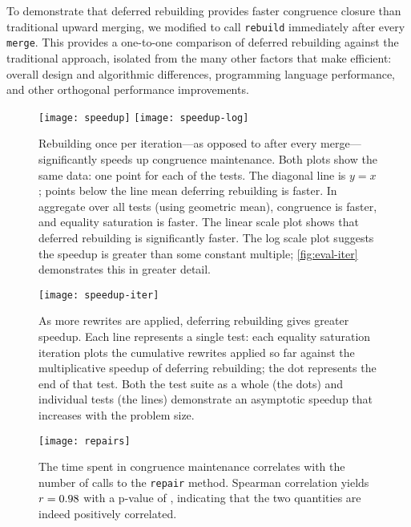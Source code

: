 To demonstrate that deferred rebuilding
  provides faster congruence closure than traditional upward merging,
  we modified \egg to call \texttt{rebuild} immediately after every \texttt{merge}.
This provides a one-to-one comparison of deferred rebuilding against the
  traditional approach, isolated
  from the many other factors that make \egg efficient: overall design
  and algorithmic differences, programming language performance, and other
  orthogonal performance improvements.

\begin{figure}
  \centering
  \texttt{[image: speedup]}
  \texttt{[image: speedup-log]}
  \caption{
    Rebuilding once per iteration---as opposed to after every merge---significantly
      speeds up congruence maintenance.
    Both plots show the same data: one point for each of the \nEggTests tests.
    The diagonal line is $y=x$;
      points below the line mean deferring rebuilding is faster.
    In aggregate over all tests (using geometric mean),
      congruence is \CongrSpeedup faster, and
      equality saturation is \TotalSpeedup faster.
    The linear scale plot shows that deferred rebuilding is significantly faster.
    The log scale plot suggests the speedup is greater than some constant multiple;
      \autoref{fig:eval-iter} demonstrates this in greater detail.
  }\label{fig:eval}
\end{figure}

\begin{figure}
  \centering
  \texttt{[image: speedup-iter]}
  \caption{
    As more rewrites are applied, deferring rebuilding gives greater speedup.
    Each line represents a single test: each equality saturation iteration plots
      the cumulative rewrites applied so far against the multiplicative speedup
      of deferring rebuilding; the dot represents the end of that test.
    Both the test suite as a whole (the dots) and individual tests (the lines)
      demonstrate an asymptotic speedup that increases with
      the problem size.
  }
  \label{fig:eval-iter}
  \vspace{1em}

  \texttt{[image: repairs]}
  \caption{
    The time spent in congruence maintenance correlates with the number of calls
    to the \texttt{repair} method.
    Spearman correlation yields $r=0.98$ with a p-value of \RepairsP,
    indicating that the two quantities are indeed positively correlated.
  }
  \label{fig:repair-plot}
\end{figure}


